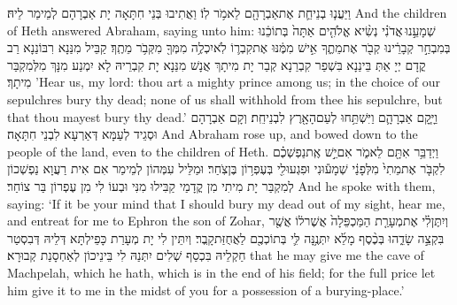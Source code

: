 {וַיַּעֲנ֧וּ בְנֵי\maqqaf חֵ֛ת אֶת\maqqaf אַבְרָהָ֖ם לֵאמֹ֥ר לֽוֹ׃}
{וַאֲתִיבוּ בְּנֵי חִתָּאָה יָת אַבְרָהָם לְמֵימַר לֵיהּ׃}
{And the children of Heth answered Abraham, saying unto him:}{}
{שְׁמָעֵ֣נוּ \legarmeh  אֲדֹנִ֗י נְשִׂ֨יא אֱלֹהִ֤ים אַתָּה֙ בְּתוֹכֵ֔נוּ בְּמִבְחַ֣ר קְבָרֵ֔ינוּ קְבֹ֖ר אֶת\maqqaf מֵתֶ֑ךָ אִ֣ישׁ מִמֶּ֔נּוּ אֶת\maqqaf קִבְר֛וֹ לֹֽא\maqqaf יִכְלֶ֥ה מִמְּךָ֖ מִקְּבֹ֥ר מֵתֶֽךָ׃}
{קַבֵּיל מִנַּנָא רִבּוֹנַנָא רַב קֳדָם יְיָ אַתְּ בֵּינַנָא בִּשְׁפַר קִבְרַנָא קְבַר יָת מִיתָךְ אֲנָשׁ מִנַּנָא יָת קִבְרֵיהּ לָא יִמְנַע מִנָּךְ מִלְּמִקְבַּר מִיתָךְ׃}
{’Hear us, my lord: thou art a mighty prince among us; in the choice of our sepulchres bury thy dead; none of us shall withhold from thee his sepulchre, but that thou mayest bury thy dead.’}{}
{וַיָּ֧קׇם אַבְרָהָ֛ם וַיִּשְׁתַּ֥חוּ לְעַם\maqqaf הָאָ֖רֶץ לִבְנֵי\maqqaf חֵֽת׃}
{וְקָם אַבְרָהָם וּסְגֵיד לְעַמָּא דְּאַרְעָא לִבְנֵי חִתָּאָה׃}
{And Abraham rose up, and bowed down to the people of the land, even to the children of Heth.}{}
{וַיְדַבֵּ֥ר אִתָּ֖ם לֵאמֹ֑ר אִם\maqqaf יֵ֣שׁ אֶֽת\maqqaf נַפְשְׁכֶ֗ם לִקְבֹּ֤ר אֶת\maqqaf מֵתִי֙ מִלְּפָנַ֔י שְׁמָע֕וּנִי וּפִגְעוּ\maqqaf לִ֖י בְּעֶפְר֥וֹן בֶּן\maqqaf צֹֽחַר׃}
{וּמַלֵּיל עִמְּהוֹן לְמֵימַר אִם אִית רַעֲוָא נַפְשְׁכוֹן לְמִקְבַּר יָת מִיתִי מִן קֳדָמַי קַבִּילוּ מִנִּי וּבְעוֹ לִי מִן עֶפְרוֹן בַּר צוֹחַר׃}
{And he spoke with them, saying: ‘If it be your mind that I should bury my dead out of my sight, hear me, and entreat for me to Ephron the son of Zohar,}{}
{וְיִתֶּן\maqqaf לִ֗י אֶת\maqqaf מְעָרַ֤ת הַמַּכְפֵּלָה֙ אֲשֶׁר\maqqaf ל֔וֹ אֲשֶׁ֖ר בִּקְצֵ֣ה שָׂדֵ֑הוּ בְּכֶ֨סֶף מָלֵ֜א יִתְּנֶ֥נָּה לִּ֛י בְּתוֹכְכֶ֖ם לַאֲחֻזַּת\maqqaf קָֽבֶר׃}
{וְיִתֵּין לִי יָת מְעָרַת כָּפֵילְתָּא דְּלֵיהּ דְּבִסְטַר חַקְלֵיהּ בִּכְסַף שְׁלִים יִתְּנַהּ לִי בֵּינֵיכוֹן לְאַחְסָנַת קְבוּרָא׃}
{that he may give me the cave of Machpelah, which he hath, which is in the end of his field; for the full price let him give it to me in the midst of you for a possession of a burying-place.’}{}
